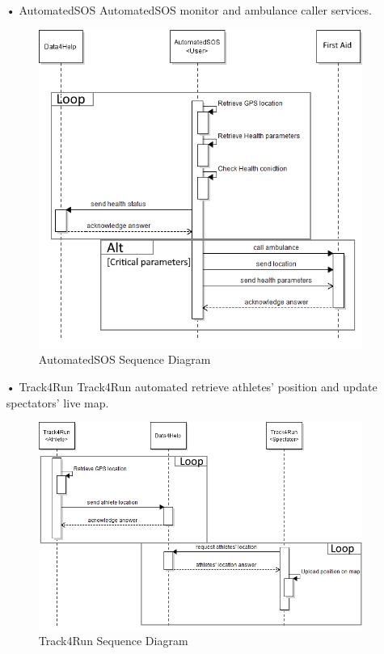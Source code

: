 \begin{enumerate}
\item[•]{\Large AutomatedSOS}
AutomatedSOS monitor and ambulance caller services.
\begin{figure}[H]
\centering
\includegraphics[scale=0.72]{Images/Seq_AutoSOS_monitor.png}
\caption{AutomatedSOS Sequence Diagram}
\end{figure}

\item[•]{\Large Track4Run}
Track4Run automated retrieve athletes' position and update spectators' live map.
\begin{figure}[H]
\centering
\includegraphics[scale=0.72]{Images/Seq_Track4Run_raceUp.png}
\caption{Track4Run Sequence Diagram}
\end{figure}
\end{enumerate}


